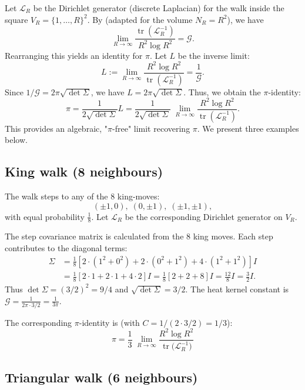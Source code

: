 \documentclass[12pt]{amsart}
\theoremstyle{definition}
\theoremstyle{remark}
\newcommand{\cG}{\mathcal{G}}    %
\DeclareMathOperator{\tr}{tr}    %
\begin{document}
Let \( \mathcal{L}_R \) be the Dirichlet generator
(discrete Laplacian) for the walk inside the square \( V_R = \{1,\dots,R\}^2 \).
By  (adapted for the volume $N_R=R^2$), we have
\[
\lim_{R\to\infty} \frac{\tr(\mathcal{L}_R^{-1})}{R^2 \log R^2} = \cG.
\]
Rearranging this yields an identity for $\pi$. Let $L$ be the inverse limit:
\[
L := \lim_{R\to\infty}\frac{R^{2}\log R^{2}}
                        {\tr(\mathcal{L}_R^{-1})} = \frac{1}{\cG}.
\]
Since $1/\cG = 2\pi\sqrt{\det\Sigma}$, we have $L = 2\pi\sqrt{\det\Sigma}$. Thus, we obtain the $\pi$-identity:
\[
\pi = \frac{1}{2\sqrt{\det\Sigma}} L = \frac{1}{2\sqrt{\det\Sigma}}\;
      \lim_{R\to\infty}\frac{R^{2}\log R^{2}}
                        {\tr(\mathcal{L}_R^{-1})}.
\]
This provides an algebraic, "$\pi$-free" limit recovering $\pi$. We present three examples below.

\subsection{King walk (8 neighbours)}\label{app:king}

The walk steps to any of the 8 king-moves:
\[
(\pm1,0),\;(0,\pm1),\;(\pm1,\pm1),
\]
with equal probability \( \tfrac18 \). Let $\mathcal{L}_R$ be the corresponding Dirichlet generator on $V_R$.

The step covariance matrix is calculated from the 8 king moves. Each step contributes to the diagonal terms:
\begin{align}
\Sigma &= \frac{1}{8}\left[2 \cdot (1^2 + 0^2) + 2 \cdot (0^2 + 1^2) + 4 \cdot (1^2 + 1^2)\right]I\\
&= \frac{1}{8}[2 \cdot 1 + 2 \cdot 1 + 4 \cdot 2]I = \frac{1}{8}[2 + 2 + 8]I = \frac{12}{8}I = \frac{3}{2}I.
\end{align}
Thus $\det\Sigma = (3/2)^2 = 9/4$ and $\sqrt{\det\Sigma} = 3/2$.
The heat kernel constant is $\cG = \frac{1}{2\pi \cdot 3/2} = \frac{1}{3\pi}$.

The corresponding $\pi$-identity is (with $C = 1/(2 \cdot 3/2) = 1/3$):
\begin{equation}\label{eq:King_pi}
\boxed{\;
\displaystyle
\pi
=\frac{1}{3}\;
   \lim_{R\to\infty}
          \frac{R^{2}\log R^{2}}
               {\tr\!\bigl(\mathcal{L}_R^{-1}\bigr)}
   \;}
\end{equation}%
\subsection{Triangular walk (6 neighbours)}\label{app:tri}
\end{document}
